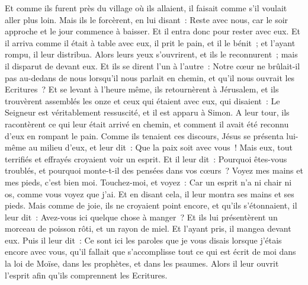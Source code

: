 \begin{multicols}{2}
Et comme ils furent près du village où ils allaient, il faisait comme s'il voulait aller plus loin.
Mais ils le forcèrent, en lui disant~: Reste avec nous, car le soir approche et le jour commence à baisser. Et il entra donc pour rester avec eux.
Et il arriva comme il était à table avec eux, il prit le pain, et il le bénit~; et l'ayant rompu, il leur distribua.
Alors leurs yeux s'ouvrirent, et ils le reconnurent~; mais il disparut de devant eux.
Et ils se dirent l'un à l'autre~: Notre cœur ne brûlait-il pas au-dedans de nous lorsqu'il nous parlait en chemin, et qu'il nous ouvrait les Ecritures~?
Et se levant à l'heure même, ils retournèrent à Jérusalem, et ils trouvèrent assemblés les onze et ceux qui étaient avec eux,
qui disaient~: Le Seigneur est véritablement ressuscité, et il est apparu à Simon.
A leur tour, ils racontèrent ce qui leur était arrivé en chemin, et comment il avait été reconnu d'eux en rompant le pain.
Comme ils tenaient ces discours, Jésus se présenta lui-même au milieu d'eux, et leur dit~: Que la paix soit avec vous~!
Mais eux, tout terrifiés et effrayés croyaient voir un esprit.
Et il leur dit~: Pourquoi êtes-vous troublés, et pourquoi monte-t-il des pensées dans vos cœurs~?
Voyez mes mains et mes pieds, c'est bien moi. Touchez-moi, et voyez~: Car un esprit n'a ni chair ni os, comme vous voyez que j'ai.
Et en disant cela, il leur montra ses mains et ses pieds.
Mais comme de joie, ils ne croyaient point encore, et qu'ils s'étonnaient, il leur dit~: Avez-vous ici quelque chose à manger~?
Et ils lui présentèrent un morceau de poisson rôti, et un rayon de miel.
Et l'ayant pris, il mangea devant eux.
Puis il leur dit~: Ce sont ici les paroles que je vous disais lorsque j'étais encore avec vous, qu'il fallait que s'accomplisse tout ce qui est écrit de moi dans la loi de Moïse, dans les prophètes, et dans les psaumes.
Alors il leur ouvrit l'esprit afin qu'ils comprennent les Ecritures.

\end{multicols}
